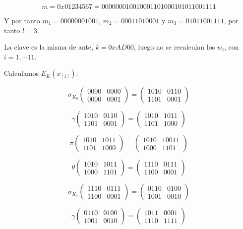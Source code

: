 \documentclass[a4paper]{article}
\begin{document}
$$m = 0x01234567 = 0000 0001 0010 0011 0100 0101 0110 0111 1$$

Y por tanto $m_1=0000 0001 001$, $m_2=0 0011 0100 01$ y $m_3=01 0110 0111 1$, por tanto $l=3$.

La clave es la misma de ante, $k=0xAD60$, luego no se recalculan los $w_i$, con $i = 1, \cdots 11$.

Calculamos $E_K(x_{[1]})$:

$$\sigma_{K_0} \begin{pmatrix} 0000 & 0000 \\ 0000 & 0001 \end{pmatrix} = \begin{pmatrix} 1010 & 0110 \\ 1101 & 0001 \end{pmatrix}$$

$$\gamma \begin{pmatrix} 1010 & 0110 \\ 1101 & 0001 \end{pmatrix} = \begin{pmatrix} 1010 & 1011 \\ 1101 & 1000 \end{pmatrix}$$

$$\pi \begin{pmatrix} 1010 & 1011 \\ 1101 & 1000 \end{pmatrix} = \begin{pmatrix} 1010 & 10011 \\ 1000 & 1101 \end{pmatrix}$$

$$\theta \begin{pmatrix} 1010 & 1011 \\ 1000 & 1101 \end{pmatrix} = \begin{pmatrix} 1110 & 0111 \\ 1100 & 0001 \end{pmatrix}$$

$$\sigma_{K_1} \begin{pmatrix} 1110 & 0111 \\ 1100 & 0001 \end{pmatrix} = \begin{pmatrix} 0110 & 0100 \\ 1001 & 0010 \end{pmatrix}$$

$$\gamma \begin{pmatrix} 0110 & 0100 \\ 1001 & 0010 \end{pmatrix} = \begin{pmatrix} 1011 & 0001 \\ 1110 & 1111 \end{pmatrix}$$
\end{document}

